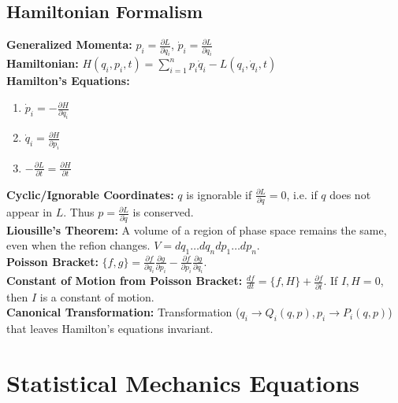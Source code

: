 \documentclass[12pt]{extarticle}
\begin{document}
\subsection*{Hamiltonian Formalism}
\textbf{Generalized Momenta: } $p_i = \frac{\partial L}{\partial \dot{q}_i}$, $\dot{p}_i = \frac{\partial L}{\partial q_i}$ \\
\textbf{Hamiltonian: } $H(q_i,p_i,t) = \sum\limits_{i=1}^n p_i\dot{q}_i - L(q_i,\dot{q}_i,t)$ \\
\textbf{Hamilton's Equations:}
\begin{enumerate}
  \item $\dot{p}_i = -\frac{\partial H}{\partial q_i}$
  \item $\dot{q}_i = \frac{\partial H}{\partial p_i}$
  \item $-\frac{\partial L}{\partial t} = \frac{\partial H}{\partial t}$
\end{enumerate}
\textbf{Cyclic/Ignorable Coordinates:} $q$ is ignorable if $\frac{\partial L}{\partial q} = 0$, i.e. if $q$ does not appear in $L$. Thus $p=\frac{\partial L}{\partial \dot{q}}$ is conserved. \\
\textbf{Liousille's Theorem: } A volume of a region of phase space remains the same, even when the refion changes. $V=dq_1 \ldots dq_ndp_1 \ldots dp_n$. \\
\textbf{Poisson Bracket: } $\{f,g\} = \frac{\partial f}{\partial q_i}\frac{\partial g}{\partial p_i} - \frac{\partial f}{\partial p_i}\frac{\partial g}{\partial q_i}$. \\
\textbf{Constant of Motion from Poisson Bracket: } $\frac{df}{dt} = \{f,H\}+\frac{\partial f}{\partial t}$. If ${I,H}=0$, then $I$ is a constant of motion. \\
\textbf{Canonical Transformation: } Transformation ($q_i \rightarrow Q_i(q,p), p_i \rightarrow P_i(q,p)$) that leaves Hamilton's equations invariant. \\

\section{Statistical Mechanics Equations}
\end{document}
